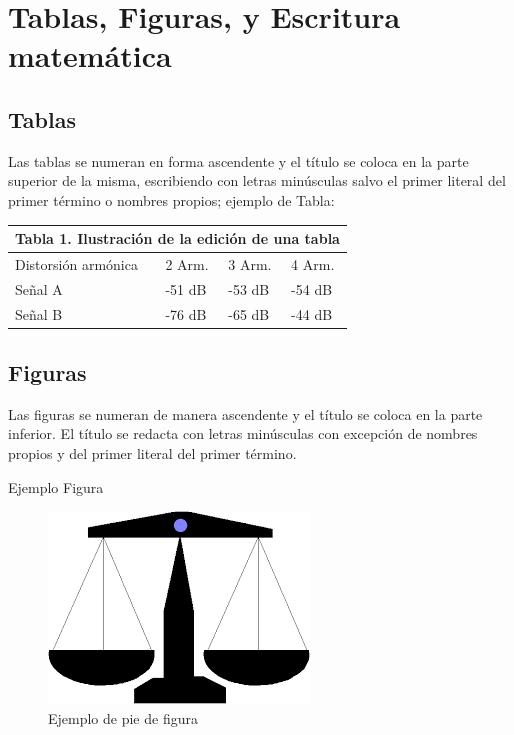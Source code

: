 \documentclass[a4paper,12pt]{article}
\begin{document}
\printbibliography %

\newpage
\section{Tablas, Figuras, y Escritura matemática }
\label{sec:tablas_figuras_matematic}

\subsection{Tablas}
Las tablas se numeran en forma ascendente y el título se coloca en la parte superior de la misma, escribiendo con letras minúsculas salvo el primer literal del primer término o nombres propios; ejemplo de Tabla:

\begin{table} [h!]
\centering

\begin{tabular}{| l | l | l | l |}
\hline
\multicolumn{4}{l}{Tabla 1. Ilustración de la edición de una tabla} \\
\hline
Distorsión armónica & 2 Arm. & 3 Arm. & 4 Arm. \\
\hline
Señal A & -51 dB & -53 dB & -54 dB \\
\hline
Señal B & -76 dB & -65 dB & -44 dB \\
\hline
\end{tabular}
\end{table}

\subsection{Figuras}

Las figuras se numeran de manera ascendente y el título se coloca en la parte inferior. El título se redacta con letras minúsculas con excepción de nombres propios y del primer literal del primer término.

Ejemplo Figura

\begin{figure}[hbt!]
    \centering
    \includegraphics[width=0.25\linewidth]{Figures/balanza.png}
    \caption{Ejemplo de pie de figura}
    \label{fig:title_fig}
\end{figure}
\end{document}
